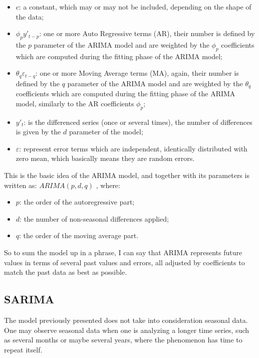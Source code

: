 \documentclass[12pt,a4paper,titlepage]{report}
\begin{document}
\begin{itemize}
    \item $ c $: a constant, which may or may not be included, depending on the shape of the data;
    \item $ \phi_{p}y'_{t-p} $: one or more Auto Regressive terms (AR), their number is defined by the $ p $ parameter of the ARIMA model and are weighted by the $ \phi_{p} $ coefficients which are computed during the fitting phase of the ARIMA model;
    \item $ \theta_{q}\varepsilon_{t-q} $: one or more Moving Average terms (MA), again, their number is defined by the $ q $ parameter of the ARIMA model and are weighted by the $ \theta_{q} $ coefficients which are computed during the fitting phase of the ARIMA model, similarly to the AR coefficients $ \phi_{p} $;
    \item $ y'_{t} $: is the differenced series (once or several times), the number of differences is given by the $ d $ parameter of the model;
    \item $ \varepsilon $: represent error terms which are independent, identically distributed with zero mean, which basically means they are random errors.
\end{itemize}

This is the basic idea of the ARIMA model, and together with its parameters is written as: $ ARIMA(p, d, q) $ \cite{fpp2nonseasonalarima}, where:
\begin{itemize}
    \item $ p $: the order of the autoregressive part;
    \item $ d $: the number of non-seasonal differences applied;
    \item $ q $: the order of the moving average part.
\end{itemize}

So to sum the model up in a phrase, I can say that ARIMA represents future values in terms of several past values and errors, all adjusted by coefficients to match the past data as best as possible.

\subsection{SARIMA}

The model previously presented does not take into consideration seasonal data. One may observe seasonal data when one is analyzing a longer time series, such as several months or maybe several years, where the phenomenon has time to repeat itself.
\end{document}
